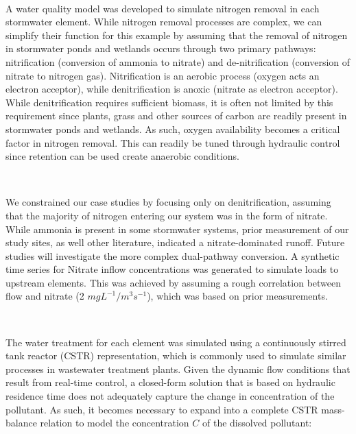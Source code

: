 \

A water quality model was developed to simulate nitrogen removal in each
stormwater element. While nitrogen removal processes are complex, we can
simplify their function for this example by assuming that the removal of nitrogen in stormwater ponds and wetlands occurs through two primary pathways: nitrification (conversion of ammonia to nitrate) and de-nitrification (conversion of nitrate to nitrogen gas)\cite{Kadlec2008TreatmentWetlands, Reddy1989Nitrification-DenitrificationWetlands}.  Nitrification is an aerobic process (oxygen acts an electron acceptor), while denitrification is anoxic (nitrate as electron acceptor). While denitrification requires sufficient biomass, it is often not limited by this requirement since plants, grass and other sources of carbon are readily present in stormwater ponds and wetlands\cite{White2009BiogeochemicalWetlands}. 
As such, oxygen availability becomes a critical factor in nitrogen removal. This can readily be tuned through hydraulic control since retention can be used create anaerobic conditions. 

\

We constrained our case studies by focusing only on denitrification, assuming that the majority of nitrogen entering our system was in the form of nitrate. While ammonia is present in some stormwater systems, prior measurement of our study sites, as well other literature\cite{Kadlec2008TreatmentWetlands}, indicated a nitrate-dominated runoff. 
Future studies will investigate the more complex dual-pathway conversion. 
A synthetic time series for Nitrate inflow concentrations was generated to simulate loads to upstream elements. 
This was achieved by assuming a rough correlation between flow and nitrate (2 $mgL^{-1}/m^3s^{-1}$), which was based on prior measurements\cite{kerkez2016}.

\

The water treatment for each element was simulated using a continuously stirred tank reactor (CSTR) representation, which is commonly used to simulate similar processes in wastewater treatment plants\cite{Henze2000ActivatedASM3}.
Given the dynamic flow conditions that result from real-time control, a closed-form solution that is based on hydraulic residence time does not adequately capture the change in concentration of the pollutant.
As such, it becomes necessary to expand into a complete CSTR mass-balance relation\cite{Alvord1996AtrazineWetlands,Kadlec2001PhosphorusWetlands,Munson2002ModelArea} to model the concentration $C$ of the dissolved pollutant:

